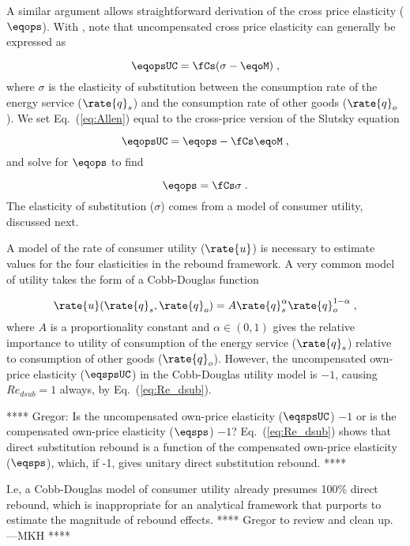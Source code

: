 A similar argument allows straightforward derivation 
of the cross price elasticity ($\eqops$).
With \citet{Hicks1934}, 
note that uncompensated cross price elasticity can generally be expressed as

\begin{equation} \label{eq:Allen}
  \eqopsUC = \fCs (\sigma - \eqoM) \; ,
\end{equation}
%
where $\sigma$ is the elasticity of substitution 
between the consumption rate of the energy service ($\rate{q}_s$) and
the consumption rate of other goods ($\rate{q}_o$). 
We set Eq.~(\ref{eq:Allen}) equal to 
the cross-price version of the Slutsky equation

\begin{equation} \label{eq:slutsky_cross}
  \eqopsUC = \eqops - \fCs \eqoM \; ,
\end{equation}
%
and solve for $\eqops$ to find

\begin{equation} \label{eq:eqops_general}
  \eqops = \fCs \sigma \; .
\end{equation}
%
The elasticity of substitution ($\sigma$)
comes from a model of consumer utility, discussed next.

A model of the rate of consumer utility ($\rate{u}$)
is necessary to estimate values for the four elasticities
in the rebound framework.
A very common model of utility takes the form of a Cobb-Douglas function

\begin{equation} \label{eq:CD_utility}
  \rate{u}(\rate{q}_s,\rate{q}_o) = A \rate{q}_s^\alpha \rate{q}_o^{1 - \alpha} \; ,
\end{equation}
%
where $A$ is a proportionality constant and
$\alpha \in (0,1)$ gives the relative importance to utility
of consumption of the energy service ($\rate{q}_s$)
relative to consumption of other goods ($\rate{q}_o$).
However, the uncompensated own-price elasticity ($\eqspsUC$)
in the Cobb-Douglas utility model is $-1$,
causing $Re_{dsub} = 1$ always,
by Eq.~(\ref{eq:Re_dsub}).

**** Gregor: Is the uncompensated own-price elasticity ($\eqspsUC$) $-1$
or is the compensated own-price elasticity ($\eqsps$) $-1$?
Eq.~(\ref{eq:Re_dsub}) shows that direct substitution rebound is a function of the
compensated own-price elasticity ($\eqsps$), which, if -1, gives unitary direct substitution rebound.
****

I.e, a Cobb-Douglas model of consumer utility already presumes 100\% direct rebound,
which is inappropriate for an analytical framework that purports to
estimate the magnitude of rebound effects.
**** Gregor to review and clean up. ---MKH ****

